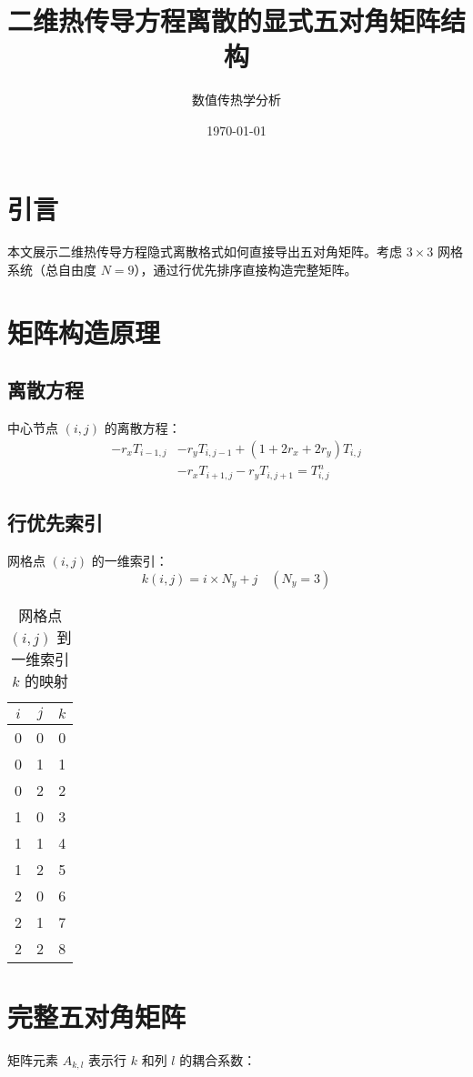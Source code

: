 \documentclass[UTF8]{ctexart}
\title{二维热传导方程离散的显式五对角矩阵结构}
\author{数值传热学分析}
\date{\today}
\begin{document}
\maketitle

\section{引言}
本文展示二维热传导方程隐式离散格式如何直接导出五对角矩阵。考虑 $3 \times 3$ 网格系统（总自由度 $N=9$），通过行优先排序直接构造完整矩阵。

\section{矩阵构造原理}

\subsection{离散方程}
中心节点 $(i,j)$ 的离散方程：
$$
\begin{split}
- r_x T_{i-1,j} &- r_y T_{i,j-1} + (1 + 2r_x + 2r_y) T_{i,j} \\
&- r_x T_{i+1,j} - r_y T_{i,j+1} = T_{i,j}^n
\end{split}
$$

\subsection{行优先索引}
网格点 $(i,j)$ 的一维索引：
$$
k(i,j) = i \times N_y + j \quad (N_y = 3)
$$

\begin{table}[h]
\centering
\caption{网格点 $(i,j)$ 到一维索引 $k$ 的映射}
\label{tab:index_mapping}
\begin{tabular}{c|c|c}
$i$ & $j$ & $k$ \\ \hline
0 & 0 & 0 \\
0 & 1 & 1 \\
0 & 2 & 2 \\
1 & 0 & 3 \\
1 & 1 & 4 \\
1 & 2 & 5 \\
2 & 0 & 6 \\
2 & 1 & 7 \\
2 & 2 & 8 \\
\end{tabular}
\end{table}

\section{完整五对角矩阵}
矩阵元素 $A_{k,l}$ 表示行 $k$ 和列 $l$ 的耦合系数：
\end{document}

